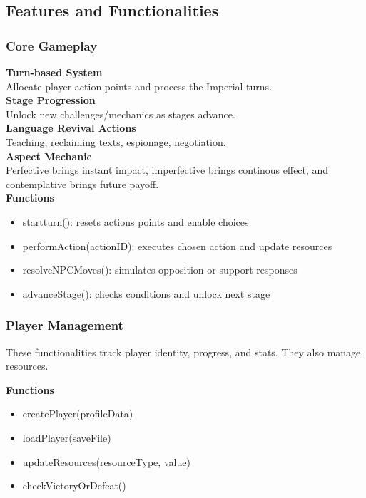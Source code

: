 \documentclass[11pt]{article}
\begin{document}
\subsection{Features and Functionalities}
\subsubsection{Core Gameplay}
\textbf{Turn-based System}\\
Allocate player action points and process the Imperial turns.\\

\textbf{Stage Progression}\\
Unlock new challenges/mechanics as stages advance.\\

\textbf{Language Revival Actions}\\
Teaching, reclaiming texts, espionage, negotiation.\\

\textbf{Aspect Mechanic}\\
Perfective brings instant impact, imperfective brings continous effect, and contemplative brings future payoff.\\

\textbf{Functions}\\
\begin{itemize}
\item
  startturn(): resets actions points and enable choices
\item
  performAction(actionID): executes chosen action and update resources
\item
  resolveNPCMoves(): simulates opposition or support responses
\item
  advanceStage(): checks conditions and unlock next stage
\end{itemize}

\subsubsection{Player Management}
These functionalities track player identity, progress, and stats. They also manage resources.

\textbf{Functions}\\
\begin{itemize}
\item
  createPlayer(profileData)
\item
  loadPlayer(saveFile)
\item
  updateResources(resourceType, value)
\item
  checkVictoryOrDefeat()
\end{itemize}
\end{document}

